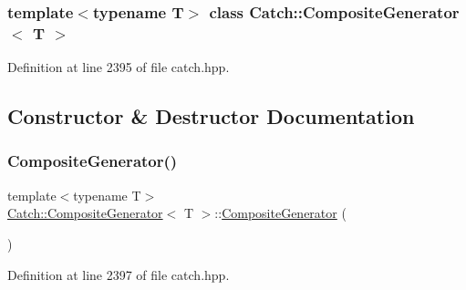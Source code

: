 \subsubsection*{template$<$typename T$>$\newline
class Catch\+::\+Composite\+Generator$<$ T $>$}



Definition at line 2395 of file catch.\+hpp.



\subsection{Constructor \& Destructor Documentation}
\hypertarget{class_catch_1_1_composite_generator_a923398b140371d1783858766864a1af5}{}\label{class_catch_1_1_composite_generator_a923398b140371d1783858766864a1af5} 
\subsubsection{\texorpdfstring{Composite\+Generator()}{CompositeGenerator()}\hspace{0.1cm}{\footnotesize\ttfamily [1/2]}}
{\footnotesize\ttfamily template$<$typename T$>$ \\
\hyperlink{class_catch_1_1_composite_generator}{Catch\+::\+Composite\+Generator}$<$ T $>$\+::\hyperlink{class_catch_1_1_composite_generator}{Composite\+Generator} (\begin{DoxyParamCaption}{ }\end{DoxyParamCaption})\hspace{0.3cm}{\ttfamily [inline]}}



Definition at line 2397 of file catch.\+hpp.

\hypertarget{class_catch_1_1_composite_generator_a21a7070a00e4a6fe021294c356692692}{}\label{class_catch_1_1_composite_generator_a21a7070a00e4a6fe021294c356692692} 
